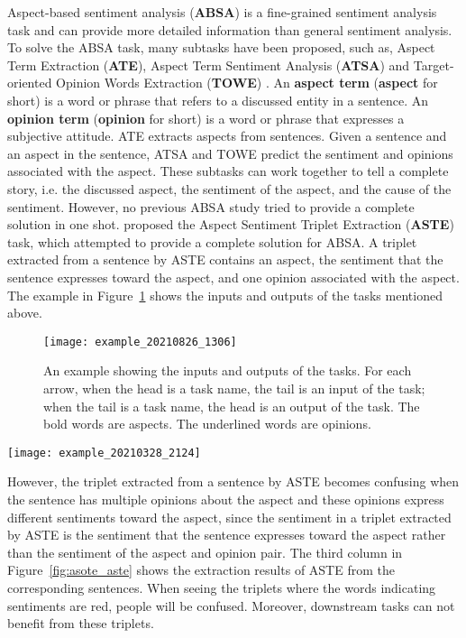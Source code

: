 \documentclass[11pt]{article}
\begin{document}
Aspect-based sentiment analysis (\textbf{ABSA}) \citep{10.1145/1014052.1014073, pontiki-etal-2014-semeval, pontiki-etal-2015-semeval, pontiki-etal-2016-semeval} is a fine-grained sentiment analysis~\citep{10.1145/945645.945658, liu2012sentiment} task and can provide more detailed information than general sentiment analysis. To solve the ABSA task, many subtasks have been proposed, such as, Aspect Term Extraction (\textbf{ATE}), Aspect Term Sentiment Analysis (\textbf{ATSA}) and Target-oriented Opinion Words Extraction (\textbf{TOWE}) \citep{fan2019target}. An \textbf{aspect term} (\textbf{aspect} for short) is a word or phrase that refers to a discussed entity in a sentence. An \textbf{opinion term} (\textbf{opinion} for short) is a word or phrase that expresses a subjective attitude. ATE extracts aspects from sentences. Given a sentence and an aspect in the sentence, ATSA and TOWE predict the sentiment and opinions associated with the aspect. These subtasks can work together to tell a complete story, i.e. the discussed aspect, the sentiment of the aspect, and the cause of the sentiment. However, no previous ABSA study tried to provide a complete solution in one shot. \citet{Peng2020KnowingWH} proposed the Aspect Sentiment Triplet Extraction (\textbf{ASTE}) task, which attempted to provide a complete solution for ABSA. A triplet extracted from a sentence by ASTE contains an aspect, the sentiment that the sentence expresses toward the aspect, and one opinion associated with the aspect. The example in Figure~\ref{fig:tasks} shows the inputs and outputs of the tasks mentioned above.

\begin{figure}
	\centering
	\texttt{[image: example\_20210826\_1306]}
	\caption{An example showing the inputs and outputs of the tasks. For each arrow, when the head is a task name, the tail is an input of the task; when the tail is a task name, the head is an output of the task. The bold words are aspects. The underlined words are opinions.}
	\label{fig:tasks}
\end{figure}

\begin{figure*}
	\centering
	\texttt{[image: example\_20210328\_2124]}
	\caption{Differences between ASOTE and ASTE. In the third sentence, the negative sentiment toward the aspect ``Food'' is expressed without an annotatable opinion.}
	\label{fig:asote_aste}
\end{figure*}

However, the triplet extracted from a sentence by ASTE becomes confusing when the sentence has multiple opinions about the aspect and these opinions express different sentiments toward the aspect, since the sentiment in a triplet extracted by ASTE is the sentiment that the sentence expresses toward the aspect rather than the sentiment of the aspect and opinion pair. The third column in Figure~\ref{fig:asote_aste}  shows the extraction results of ASTE from the corresponding sentences. When seeing the triplets where the words indicating sentiments are red, people will be confused. Moreover, downstream tasks can not benefit from these triplets. 
\end{document}
